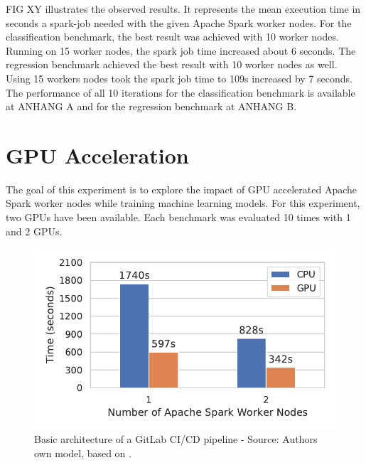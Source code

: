 FIG XY illustrates the observed results. It represents the mean execution time in seconds a spark-job needed with the given Apache Spark worker nodes.
For the classification benchmark, the best result was achieved with 10 worker nodes. Running on 15 worker nodes, the spark job time increased about 6 seconds.
The regression benchmark achieved the best result with 10 worker nodes as well. Using 15 workers nodes took the spark job time to 109s increased by 7 seconds.
The performance of all 10 iterations for the classification benchmark is available at ANHANG A and for the regression benchmark at ANHANG B.


\section{GPU Acceleration}
The goal of this experiment is to explore the impact of GPU accelerated Apache Spark worker nodes while training machine learning models.
For this experiment, two GPUs have been available. Each benchmark was evaluated 10 times with 1 and 2 GPUs.
%
\begin{figure}[h]
\centering
\includegraphics[scale=1]{images/07_evaluation/mortgage/mortgage_gpu_vs_cpu}
\caption{Basic architecture of a GitLab CI/CD pipeline - Source: Authors own model, based on \cite{Gitlab2020Docs}.}
\label{fig:07_mortgage_static-gpu_results}
\end{figure}
